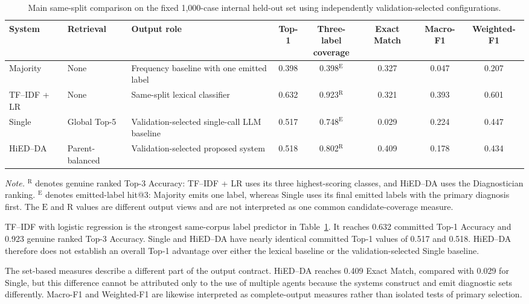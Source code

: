 \begin{table}[H]
\centering
\caption{Main same-split comparison on the fixed 1,000-case internal held-out set using independently validation-selected configurations.}
\label{tab:matched-baselines-retrieval}
\small
\begin{adjustbox}{max width=\textwidth}
\begin{tabular}{|l|l|>{\raggedright\arraybackslash}p{3.5cm}|c|c|c|c|c|}
\hline
System & Retrieval & Output role & Top-1 & \shortstack{Three-label\\coverage} & Exact Match & Macro-F1 & Weighted-F1\\
\hline
Majority & None & Frequency baseline with one emitted label & 0.398 & 0.398$^{\mathrm{E}}$ & 0.327 & 0.047 & 0.207\\
\hline
TF--IDF + LR & None & Same-split lexical classifier & 0.632 & 0.923$^{\mathrm{R}}$ & 0.321 & 0.393 & 0.601\\
\hline
Single & Global Top-5 & Validation-selected single-call LLM baseline & 0.517 & 0.748$^{\mathrm{E}}$ & 0.029 & 0.224 & 0.447\\
\hline
HiED--DA & Parent-balanced & Validation-selected proposed system & 0.518 & 0.802$^{\mathrm{R}}$ & 0.409 & 0.178 & 0.434\\
\hline
\end{tabular}
\end{adjustbox}
\parbox{0.96\textwidth}{\footnotesize
\textit{Note.} $^{\mathrm{R}}$ denotes genuine ranked Top-3 Accuracy: TF--IDF + LR uses its three highest-scoring classes, and HiED--DA uses the Diagnostician ranking. $^{\mathrm{E}}$ denotes emitted-label hit@3: Majority emits one label, whereas Single uses its final emitted labels with the primary diagnosis first. The $\mathrm{E}$ and $\mathrm{R}$ values are different output views and are not interpreted as one common candidate-coverage measure.
}
\end{table}

TF--IDF with logistic regression is the strongest same-corpus label predictor in Table~\ref{tab:matched-baselines-retrieval}. It reaches 0.632 committed Top-1 Accuracy and 0.923 genuine ranked Top-3 Accuracy. Single and HiED--DA have nearly identical committed Top-1 values of 0.517 and 0.518. HiED--DA therefore does not establish an overall Top-1 advantage over either the lexical baseline or the validation-selected Single baseline.

The set-based measures describe a different part of the output contract. HiED--DA reaches 0.409 Exact Match, compared with 0.029 for Single, but this difference cannot be attributed only to the use of multiple agents because the systems construct and emit diagnostic sets differently. Macro-F1 and Weighted-F1 are likewise interpreted as complete-output measures rather than isolated tests of primary selection.

